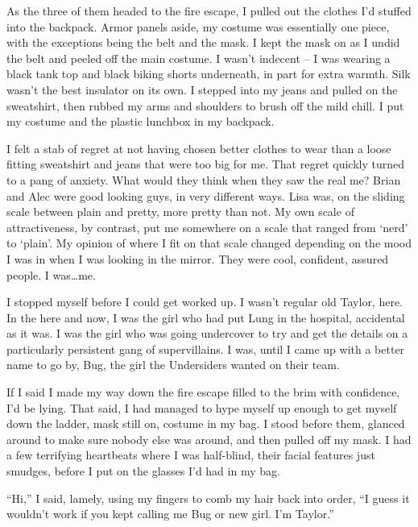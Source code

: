 As the three of them headed to the fire escape, I pulled out the clothes I'd stuffed into the backpack.  Armor panels aside, my costume was essentially one piece, with the exceptions being the belt and the mask.  I kept the mask on as I undid the belt and peeled off the main costume.  I wasn't indecent – I was wearing a black tank top and black biking shorts underneath, in part for extra warmth.   Silk wasn't the best insulator on its own.  I stepped into my jeans and pulled on the sweatshirt, then rubbed my arms and shoulders to brush off the mild chill.  I put my costume and the plastic lunchbox in my backpack.



I felt a stab of regret at not having chosen better clothes to wear than a loose fitting sweatshirt and jeans that were too big for me.  That regret quickly turned to a pang of anxiety.  What would they think when they saw the real me?  Brian and Alec were good looking guys, in very different ways.  Lisa was, on the sliding scale between plain and pretty, more pretty than not.  My own scale of attractiveness, by contrast, put me somewhere on a scale that ranged from `nerd' to `plain'.  My opinion of where I fit on that scale changed depending on the mood I was in when I was looking in the mirror.  They were cool, confident, assured people.  I was\ldots me.



I stopped myself before I could get worked up.  I wasn't regular old Taylor, here.  In the here and now, I was the girl who had put Lung in the hospital, accidental as it was.  I was the girl who was going undercover to try and get the details on a particularly persistent gang of supervillains.  I was, until I came up with a better name to go by, Bug, the girl the Undersiders wanted on their team.



If I said I made my way down the fire escape filled to the brim with confidence, I'd be lying.  That said, I had managed to hype myself up enough to get myself down the ladder, mask still on, costume in my bag.  I stood before them, glanced around to make sure nobody else was around, and then pulled off my mask.  I had a few terrifying heartbeats where I was half-blind, their facial features just smudges, before I put on the glasses I'd had in my bag.



``Hi,'' I said, lamely, using my fingers to comb my hair back into order, ``I guess it wouldn't work if you kept calling me Bug or new girl.  I'm Taylor.''



